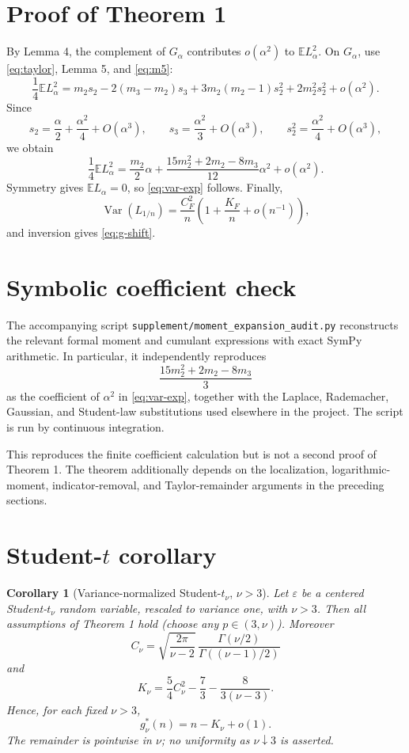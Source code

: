 \documentclass[11pt,a4paper]{article}
\newtheorem{corollary}{Corollary}
\newcommand{\E}{\mathbb E}
\newcommand{\Var}{\operatorname{Var}}
\begin{document}
\section{Proof of Theorem 1}
By Lemma 4, the complement of $G_\alpha$ contributes $o(\alpha^2)$ to $\E L_\alpha^2$.  On $G_\alpha$, use \eqref{eq:taylor}, Lemma 5, and \eqref{eq:m5}:
\[
\frac14\E L_\alpha^2
=m_2s_2-2(m_3-m_2)s_3
+3m_2(m_2-1)s_2^2
+2m_2^2s_2^2
+o(\alpha^2).
\]
Since
\[
s_2=\frac\alpha2+\frac{\alpha^2}{4}+O(\alpha^3),
\qquad
s_3=\frac{\alpha^2}{3}+O(\alpha^3),
\qquad
s_2^2=\frac{\alpha^2}{4}+O(\alpha^3),
\]
we obtain
\[
\frac14\E L_\alpha^2
=\frac{m_2}{2}\alpha
+\frac{15m_2^2+2m_2-8m_3}{12}\alpha^2
+o(\alpha^2).
\]
Symmetry gives $\E L_\alpha=0$, so \eqref{eq:var-exp} follows.  Finally,
\[
\Var(L_{1/n})=\frac{C_F^2}{n}\left(1+\frac{K_F}{n}+o(n^{-1})\right),
\]
and inversion gives \eqref{eq:g-shift}.

\section{Symbolic coefficient check}
The accompanying script
\texttt{supplement/moment\_expansion\_audit.py} reconstructs the relevant
formal moment and cumulant expressions with exact SymPy arithmetic.  In
particular, it independently reproduces
\[
\frac{15m_2^2+2m_2-8m_3}{3}
\]
as the coefficient of $\alpha^2$ in \eqref{eq:var-exp}, together with the
Laplace, Rademacher, Gaussian, and Student-law substitutions used elsewhere in
the project.  The script is run by continuous integration.

This reproduces the finite coefficient calculation but is not a second proof
of Theorem 1.  The theorem additionally depends on the
localization, logarithmic-moment, indicator-removal, and Taylor-remainder
arguments in the preceding sections.

\section{\texorpdfstring{Student-$t$}{Student-t} corollary}
\begin{corollary}[Variance-normalized Student-$t_\nu$, $\nu>3$]
Let $\varepsilon$ be a centered Student-$t_\nu$ random variable, rescaled to variance one, with $\nu>3$.  Then all assumptions of Theorem 1 hold (choose any $p\in(3,\nu)$).  Moreover
\begin{equation}\label{eq:Cnu}
\boxed{
C_\nu
=\sqrt{\frac{2\pi}{\nu-2}}\,
\frac{\Gamma(\nu/2)}{\Gamma((\nu-1)/2)} }
\end{equation}
and
\begin{equation}\label{eq:Knu}
\boxed{
K_\nu
=\frac54 C_\nu^2-\frac73-\frac{8}{3(\nu-3)}. }
\end{equation}
Hence, for each fixed $\nu>3$,
\[
\boxed{
 g_\nu^*(n)=n-K_\nu+o(1).}
\]
The remainder is pointwise in $\nu$; no uniformity as $\nu\downarrow3$ is asserted.
\end{corollary}
\end{document}
